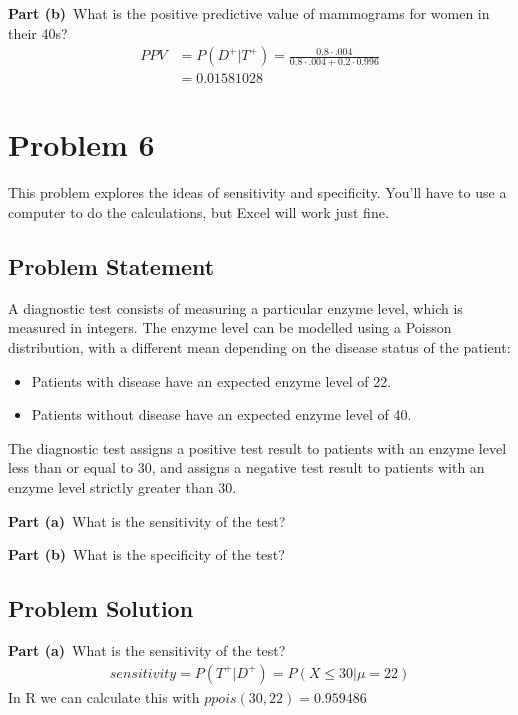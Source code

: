 \documentclass[12pt]{article}
\theoremstyle{definition}
\begin{document}
\vspace{1.5in}
\noindent
{\bf Part (b)}\ What is the positive predictive value of mammograms for women in their 40s?
\begin{align*}
PPV &= P(D^+|T^+) = \frac{0.8 \cdot .004}{0.8 \cdot .004 + 0.2 \cdot 0.996}\\
&= 0.01581028
\end{align*}


\newpage
\section*{Problem 6}

This problem explores the ideas of sensitivity and specificity. You'll have to use a computer to do the calculations, but Excel will work just fine.

\subsection*{Problem Statement}

A diagnostic test consists of measuring a particular enzyme level, which is measured in integers. The enzyme level can be modelled using a Poisson distribution, with a different mean depending on the disease status of the patient:
\begin{itemize}
	\item Patients with disease have an expected enzyme level of 22.
	\item Patients without disease have an expected enzyme level of 40.
\end{itemize}
The diagnostic test assigns a positive test result to patients with an enzyme level less than or equal to 30, and assigns a negative test result to patients with an enzyme level strictly greater than 30.

\bigskip
\noindent
{\bf Part (a)}\ What is the sensitivity of the test?

\bigskip
\noindent
{\bf Part (b)}\ What is the specificity of the test?


\subsection*{Problem Solution}

\noindent
{\bf Part (a)}\ What is the sensitivity of the test?
\begin{align*}
sensitivity = P(T^+|D^+) = P(X \leq 30|\mu = 22)
\end{align*}
In R we can calculate this with $ppois(30, 22) = 0.959486$
\end{document}

